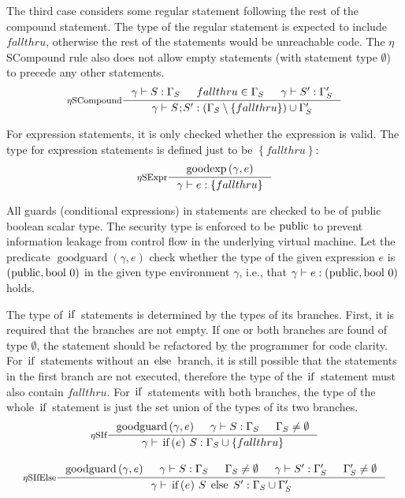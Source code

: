 \documentclass[a4paper, 10pt, draft]{report}
\DeclareMathOperator*{\goodguard}{goodguard}
\newcommand{\mycode}[1]{\ensuremath{\mbox{\lstinline{#1}}}}
\begin{document}
The third case considers some regular statement following the rest of the
compound statement. The type of the regular statement is expected to include
$fallthru$, otherwise the rest of the statements would be unreachable code. The
$\eta$SCompound rule also does not allow empty statements (with statement type
$\emptyset$) to precede any other statements.
\[ \inference[$\eta$SCompound]{
  \gamma |- S : \Gamma_S & fallthru \in \Gamma_S & \gamma |- S' : \Gamma'_S
}{
  \gamma |- S\mycode{;}S' : \left( \Gamma_S \setminus \left\{ fallthru \right\} \right) \cup \Gamma'_S
} \]

For expression statements, it is only checked whether the expression is valid.
The type for expression statements is defined just to be $\left\{ fallthru
\right\}$:
\[ \inference[$\eta$SExpr]{
  \operatorname{goodexp}\left( \gamma, e \right)
}{
  \gamma |- e : \left\{ fallthru \right\}
} \]

All guards (conditional expressions) in statements are checked to be of public
boolean scalar type. The security type is enforced to be \mycode{public} to
prevent information leakage from control flow in the underlying virtual
machine. Let the predicate $\operatorname{goodguard}\!\left(\gamma, e\right)$
check whether the type of the given expression $e$ is $\left(\mycode{public},
\mycode{bool}\ 0\right)$ in the given type environment $\gamma$, i.e., that
$\gamma |- e : \left(\mycode{public}, \mycode{bool}\ 0\right)$ holds.

The type of \mycode{if} statements is determined by the types of its branches.
First, it is required that the branches are not empty. If one or both branches
are found of type $\emptyset$, the statement should be refactored by the
programmer for code clarity. For \mycode{if} statements without an
\mycode{else} branch, it is still possible that the statements in the first
branch are not executed, therefore the type of the \mycode{if} statement must
also contain $fallthru$. For \mycode{if} statements with both branches, the
type of the whole \mycode{if} statement is just the set union of the types of
its two branches.
\[\begin{array}{c}
\inference[$\eta$SIf]{
  \goodguard\left( \gamma, e \right) &
    \gamma |- S : \Gamma_S &
    \Gamma_S \neq \emptyset
}{
  \gamma |- \mycode{if(}e\mycode{)}\ S : \Gamma_S \cup \left\{ fallthru \right\}
} \\[2em]
\inference[$\eta$SIfElse]{
  \goodguard\left( \gamma, e \right) &
    \gamma |- S : \Gamma_S &
    \Gamma_S \neq \emptyset &
    \gamma |- S' : \Gamma'_S &
    \Gamma'_S \neq \emptyset
}{
  \gamma |- \mycode{if(}e\mycode{)}\ S\ \mycode{else}\ S' : \Gamma_S \cup \Gamma'_S
}
\end{array} \]
\end{document}
